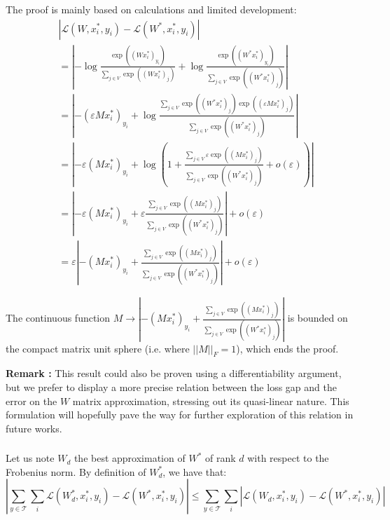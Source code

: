 \subsubsection{}
\label{app:linear_rel}
The proof is mainly based on calculations and limited development:
\begin{align*}
& |\mathcal{L}(W, x^*_i, y_i) - \mathcal{L}(W^*, x^*_i, y_i)| \\
& =
\left| -\log \frac{\exp((Wx^*_i)_{y_i})}{\sum_{j \in V} \exp((Wx^*_i)_{j})} + \log\frac{\exp((W^*x^*_i)_{y_i})}{\sum_{j \in V} \exp((W^*x^*_i)_{j})}\right| \\
& =  \left|-(\varepsilon Mx^*_i)_{y_i} + \log \frac{\sum_{j \in V} \exp((W^*x^*_i)_{j}) \exp((\varepsilon Mx^*_i)_{j})}{\sum_{j \in V} \exp((W^*x^*_i)_{j})}\right| \\
& = \left| - \varepsilon (M x^*_i)_{y_i} + \log\left( 1 + \frac{\sum_{j \in V} \varepsilon \exp((Mx^*_i)_{j})}{\sum_{j \in V} \exp((W^*x^*_i)_{j})} + o(\varepsilon) \right) \right| \\
& = \left| -\varepsilon (M x^*_i)_{y_i} + \varepsilon  \frac{\sum_{j \in V} \exp((Mx^*_i)_{j})}{\sum_{j \in V} \exp((W^*x^*_i)_{j})} \right| + o(\varepsilon) \\
& = \varepsilon \left| - (M x^*_i)_{y_i} + \frac{\sum_{j \in V} \exp((Mx^*_i)_{j})}{\sum_{j \in V} \exp((W^*x^*_i)_{j})} \right| + o(\varepsilon)
\end{align*}

The continuous function $M \longrightarrow \left| - (M x^*_i)_{y_i} + \frac{\sum_{j \in V} \exp((Mx^*_i)_{j})}{\sum_{j \in V} \exp((W^*x^*_i)_{j})} \right|$ is bounded on the compact matrix unit sphere (i.e. where $||M||_F = 1$), which ends the proof.

\textbf{Remark : }This result could also be proven using a differentiability argument, but we prefer to display a more precise relation between the loss gap and the error on the $W$ matrix approximation, stressing out its quasi-linear nature. This formulation will hopefully pave the way for further exploration of this relation in future works.

\subsubsection{}
\label{app:main_thm}
Let us note $W_d$ the best approximation of $W^*$ of rank $d$ with respect to the Frobenius norm. By definition of $W_d^*$, we have that:
\begin{equation}
\label{eq:approx}
    \left|\sum_{y \in \mathcal{T}} \sum_{i} \mathcal{L}(W_d^*, x^*_i, y_i) - \mathcal{L}(W^*, x^*_i, y_i)\right| \leq \sum_{y \in \mathcal{T}} \sum_{i} \left|\mathcal{L}(W_d, x^*_i, y_i) - \mathcal{L}(W^*, x^*_i, y_i)\right|
\end{equation}

